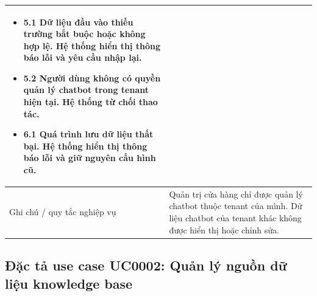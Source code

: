 \documentclass[../DoAn.tex]{subfiles}
\begin{document}
\begin{longtable}{|p{}|p{}|}
\begin{minipage}[t]{0.68\textwidth}
\begin{itemize}
    \item \textbf{5.1} Dữ liệu đầu vào thiếu trường bắt buộc hoặc không hợp lệ. Hệ thống hiển thị thông báo lỗi và yêu cầu nhập lại.
    \item \textbf{5.2} Người dùng không có quyền quản lý chatbot trong tenant hiện tại. Hệ thống từ chối thao tác.
    \item \textbf{6.1} Quá trình lưu dữ liệu thất bại. Hệ thống hiển thị thông báo lỗi và giữ nguyên cấu hình cũ.
\end{itemize}
\end{minipage}
\\
\hline
Ghi chú / quy tắc nghiệp vụ & Quản trị cửa hàng chỉ được quản lý chatbot thuộc tenant của mình. Dữ liệu chatbot của tenant khác không được hiển thị hoặc chỉnh sửa. \\
\hline
\end{longtable}

\subsection{Đặc tả use case UC0002: Quản lý nguồn dữ liệu knowledge base}
\label{subsection:2.3.2}
\end{document}
